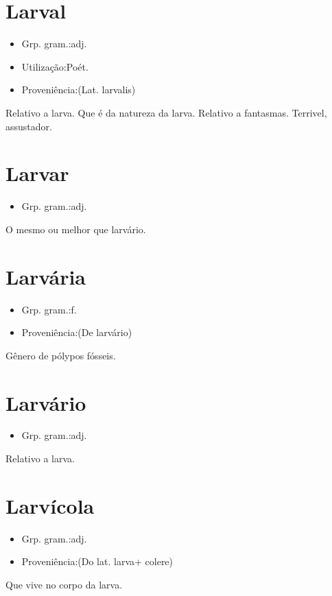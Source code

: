 \section{Larval}
\begin{itemize}
\item {Grp. gram.:adj.}
\end{itemize}
\begin{itemize}
\item {Utilização:Poét.}
\end{itemize}
\begin{itemize}
\item {Proveniência:(Lat. \textunderscore larvalis\textunderscore )}
\end{itemize}
Relativo a larva.
Que é da natureza da larva.
Relativo a fantasmas.
Terrivel, assustador.
\section{Larvar}
\begin{itemize}
\item {Grp. gram.:adj.}
\end{itemize}
O mesmo ou melhor que \textunderscore larvário\textunderscore .
\section{Larvária}
\begin{itemize}
\item {Grp. gram.:f.}
\end{itemize}
\begin{itemize}
\item {Proveniência:(De \textunderscore larvário\textunderscore )}
\end{itemize}
Gênero de pólypos fósseis.
\section{Larvário}
\begin{itemize}
\item {Grp. gram.:adj.}
\end{itemize}
Relativo a larva.
\section{Larvícola}
\begin{itemize}
\item {Grp. gram.:adj.}
\end{itemize}
\begin{itemize}
\item {Proveniência:(Do lat. \textunderscore larva\textunderscore  + \textunderscore colere\textunderscore )}
\end{itemize}
Que vive no corpo da larva.
